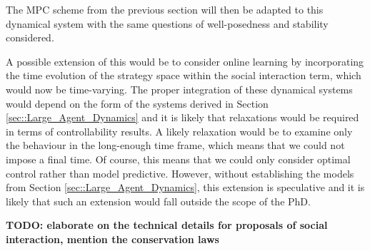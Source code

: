 \documentclass[.../main.tex]{subfiles}
\begin{document}
	The MPC scheme from the previous section will then be adapted to this dynamical system with the
	same questions of well-posedness and stability considered. 

	A possible extension of this would be to consider online learning by incorporating the time
	evolution of the strategy space within the social interaction term, which would now be
	time-varying. The proper integration of these dynamical systems would depend on the form of the
	systems derived in Section \ref{sec::Large_Agent_Dynamics} and it is likely that relaxations would
	be required in terms of controllability results. A likely relaxation would be to examine only the
	behaviour in the long-enough time frame, which means that we could not impose a final time. Of
	course, this means that we could only consider optimal control rather than model predictive.
	However, without establishing the models from Section \ref{sec::Large_Agent_Dynamics}, this
	extension is speculative and it is likely that such an extension would fall outside the scope of
	the PhD.

	\textbf{TODO: elaborate on the technical details for proposals of social interaction, mention
	the conservation laws}
\end{document}
